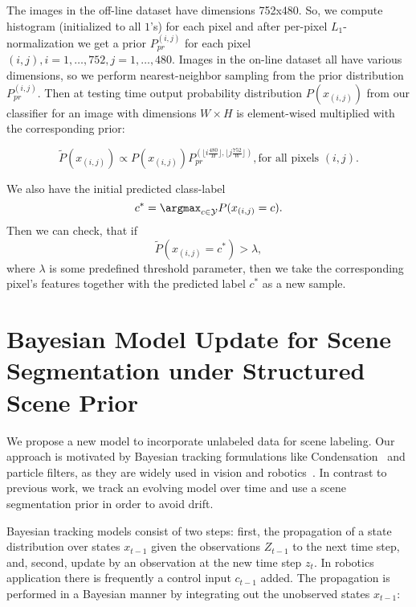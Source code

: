The images in the off-line dataset have dimensions 752x480. So, we compute histogram (initialized to all $1$'s) for each pixel and after per-pixel 
$L_1$-normalization we get a prior $P_{pr}^{(i, j)}$ for each pixel $(i, j), i = 1,\dots, 752, j = 1,\dots,480$. Images in the on-line dataset 
all have various dimensions, so we perform nearest-neighbor sampling from the prior distribution $P_{pr}^{(i, j)}$. Then at testing time
output probability distribution $P(x_{(i, j)})$ from our classifier for an image with dimensions $W \times H$ is element-wised multiplied 
with the corresponding prior:

\begin{equation}
 \tilde{P}(x_{(i, j)}) \propto P(x_{(i, j)})P_{pr}^{(\lfloor {i\frac{480}{H}} \rfloor, \lfloor {j\frac{752}{W}} \rfloor)}, \text{for all pixels $(i, j)$}.
\end{equation}

We also have the initial predicted class-label
\begin{equation}
 c^* = \argmax_{c \in \mathcal{Y}} P(x_{(i, j)} = c).
\end{equation}
Then we can check, that if 
\begin{equation}
 \tilde{P}(x_{(i, j)} = c^*) > \lambda,
\end{equation}
where $\lambda$ is some predefined threshold parameter, then we take the corresponding pixel's features together with the predicted label $c^*$ as a 
new sample.

\section{Bayesian Model Update for Scene Segmentation under Structured Scene Prior}
\label{sec:bayesian_theory}

We propose a new model to incorporate unlabeled data for scene labeling. Our approach is motivated by Bayesian tracking formulations 
like Condensation~\cite{Isard1998} and particle filters, as they are widely used in vision and robotics~\cite{Dellaert1999}. 
In contrast to previous work, we track an evolving model over time and use a scene segmentation prior in order to avoid drift. 

Bayesian tracking models consist of two steps: first, the propagation of a state distribution over states $x_{t-1}$ given 
the observations $Z_{t-1}$ to the next time step, and, second, update by an observation at the new time step $z_t$. 
In robotics application there is frequently a control input $c_{t-1}$ added. The propagation is performed in a Bayesian manner 
by integrating out the unobserved states $x_{t-1}$:

